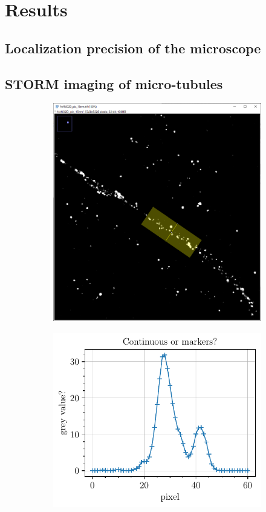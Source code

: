 \section{Results}
\subsection{Localization precision of the microscope}


\subsection{STORM imaging of micro-tubules}
\begin{figure}[htbp]
    \begin{subfigure}{0.5\textwidth}
        \includegraphics[width=\textwidth]{figures/microtubules_width_acquisition.PNG}
    \end{subfigure}
    \begin{subfigure}{0.5\textwidth}
        \includegraphics[scale=1]{figures/microtubules_width.pdf}

\end{subfigure}
\end{figure}
